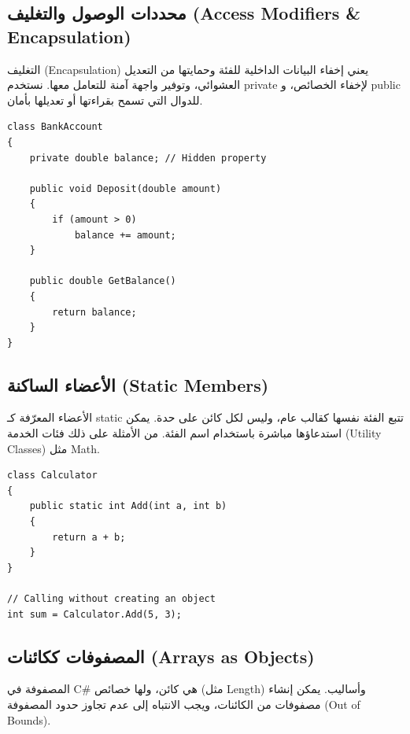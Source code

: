 \documentclass[14pt]{extarticle}
\begin{document}
\subsection{محددات الوصول والتغليف (\textenglish{Access Modifiers \& Encapsulation})}
التغليف (\textenglish{Encapsulation}) يعني إخفاء البيانات الداخلية للفئة وحمايتها من التعديل العشوائي، وتوفير واجهة آمنة للتعامل معها. نستخدم \textenglish{private} لإخفاء الخصائص، و \textenglish{public} للدوال التي تسمح بقراءتها أو تعديلها بأمان.

\begin{boxExample}
\begin{english}
\begin{verbatim}
class BankAccount
{
    private double balance; // Hidden property

    public void Deposit(double amount)
    {
        if (amount > 0)
            balance += amount;
    }

    public double GetBalance()
    {
        return balance;
    }
}
\end{verbatim}
\end{english}
\end{boxExample}

\subsection{الأعضاء الساكنة (\textenglish{Static Members})}
الأعضاء المعرّفة كـ \textenglish{static} تتبع الفئة نفسها كقالب عام، وليس لكل كائن على حدة. يمكن استدعاؤها مباشرة باستخدام اسم الفئة. من الأمثلة على ذلك فئات الخدمة (\textenglish{Utility Classes}) مثل \textenglish{Math}.

\begin{boxExample}
\begin{english}
\begin{verbatim}
class Calculator
{
    public static int Add(int a, int b)
    {
        return a + b;
    }
}

// Calling without creating an object
int sum = Calculator.Add(5, 3);
\end{verbatim}
\end{english}
\end{boxExample}

\subsection{المصفوفات ككائنات (\textenglish{Arrays as Objects})}
المصفوفة في \textenglish{C\#} هي كائن، ولها خصائص (مثل \textenglish{Length}) وأساليب. يمكن إنشاء مصفوفات من الكائنات، ويجب الانتباه إلى عدم تجاوز حدود المصفوفة (\textenglish{Out of Bounds}).
\end{document}
